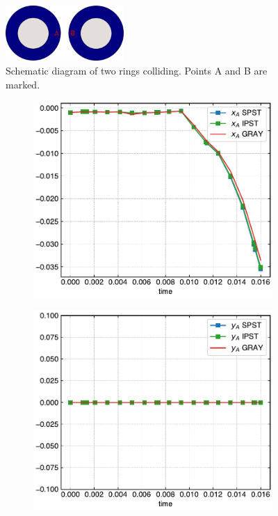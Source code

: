 %
%
\begin{figure}
  \centering
  \includegraphics[width=0.4\textwidth]{images/ctvf/images/rings/rings_initial}
  \caption{Schematic diagram of two rings colliding. Points A and B are marked.}
\label{fig:rings_initial}
\end{figure}

\begin{figure}
  \centering
  \begin{subfigure}{0.48\textwidth}
    \centering
    \includegraphics[width=1.0\textwidth]{figures/ctvf/figures/rings/sun_vs_ipst_vs_gray_a_b_0_3975_x}
    \label{fig:rings-compare-x}
  \end{subfigure}
  \begin{subfigure}{0.48\textwidth}
    \centering
    \includegraphics[width=1.0\textwidth]{figures/ctvf/figures/rings/sun_vs_ipst_vs_gray_a_b_0_3975_y}

\end{subfigure}
\end{figure}
